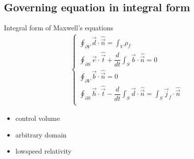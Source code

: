 \documentclass[letterpaper,10pt,english]{jupyterBook}
\begin{document}
\subsection{Governing equation in integral form}
\label{\detokenize{ch/principles-matter:governing-equation-in-integral-form}}\label{\detokenize{ch/principles-matter:classical-electromagnetism-media-integral}}
\sphinxAtStartPar
Integral form of Maxwell’s equations
\begin{equation*}
\begin{split}\begin{cases}
 \displaystyle \oint_{\partial V} \vec{d} \cdot \hat{\vec{n}} = \int_{V} \rho_f \\
 \displaystyle \oint_{\partial S} \vec{e} \cdot \hat{\vec{t}} + \dfrac{d}{dt} \int_S \vec{b} \cdot \hat{\vec{n}} = 0 \\
 \displaystyle \oint_{\partial V} \vec{b} \cdot \hat{\vec{n}} = 0 \\
 \displaystyle \oint_{\partial S} \vec{h} \cdot \hat{\vec{t}} - \dfrac{d}{dt} \int_S \vec{d} \cdot \hat{\vec{n}} = \int_{S} \vec{j}_f \cdot \hat{\vec{n}} \\
\end{cases}\end{split}
\end{equation*}\begin{itemize}
\item {} 
\sphinxAtStartPar
control volume

\item {} 
\sphinxAtStartPar
arbitrary domain

\item {} 
\sphinxAtStartPar
low\sphinxhyphen{}speed relativity

\end{itemize}
\end{document}
